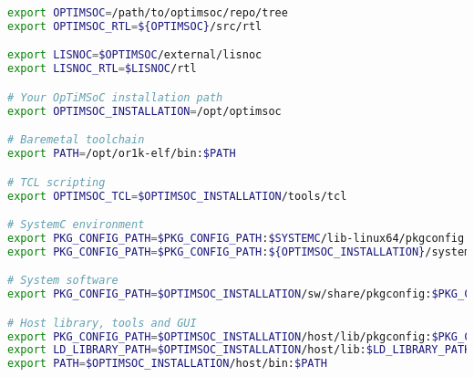 \begin{lstlisting}[language=bash]
export OPTIMSOC=/path/to/optimsoc/repo/tree
export OPTIMSOC_RTL=${OPTIMSOC}/src/rtl

export LISNOC=$OPTIMSOC/external/lisnoc
export LISNOC_RTL=$LISNOC/rtl

# Your OpTiMSoC installation path
export OPTIMSOC_INSTALLATION=/opt/optimsoc

# Baremetal toolchain
export PATH=/opt/or1k-elf/bin:$PATH

# TCL scripting
export OPTIMSOC_TCL=$OPTIMSOC_INSTALLATION/tools/tcl

# SystemC environment
export PKG_CONFIG_PATH=$PKG_CONFIG_PATH:$SYSTEMC/lib-linux64/pkgconfig
export PKG_CONFIG_PATH=$PKG_CONFIG_PATH:${OPTIMSOC_INSTALLATION}/systemc/share/pkgconfig

# System software
export PKG_CONFIG_PATH=$OPTIMSOC_INSTALLATION/sw/share/pkgconfig:$PKG_CONFIG_PATH

# Host library, tools and GUI
export PKG_CONFIG_PATH=$OPTIMSOC_INSTALLATION/host/lib/pkgconfig:$PKG_CONFIG_PATH
export LD_LIBRARY_PATH=$OPTIMSOC_INSTALLATION/host/lib:$LD_LIBRARY_PATH
export PATH=$OPTIMSOC_INSTALLATION/host/bin:$PATH
\end{lstlisting}

